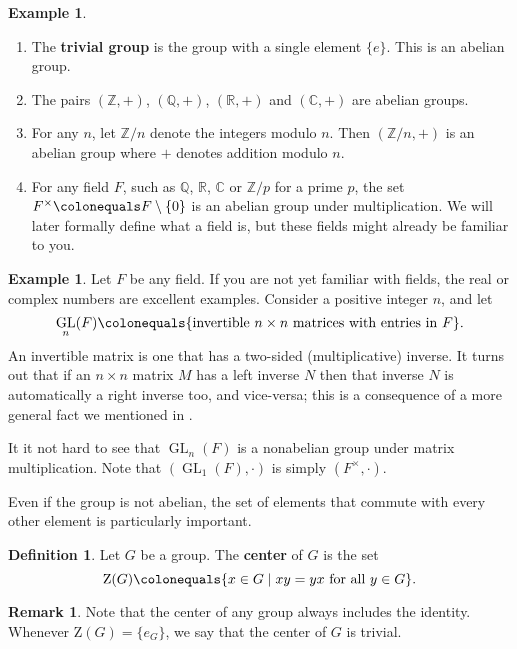 \documentclass[12pt]{report}
\numberwithin{equation}{section}
\numberwithin{theorem}{chapter}
\theoremstyle{definition}
\newtheorem{definition}[theorem]{Definition}
\newtheorem{example}[theorem]{Example}
\newtheorem*{basic properties}{Basic Properties}
\newtheorem*{Important Remark}{Important Remark}
\newtheorem{remark}[theorem]{Remark}
\newcommand{\df}[1]{{\bf #1}\index{#1}}
\DeclareMathOperator{\GL}{GL}
\newcommand{\C}{\mathbb{C}}
\begin{document}
\begin{example}$\,$
\begin{enumerate}
\item The \df{trivial group} is the group with a single element $\{e\}$. This is an abelian group. 
\item  The pairs $(\mathbb{Z}, +)$, $(\mathbb{Q}, +)$, $(\mathbb{R}, +)$ and $(\C,+)$ are abelian groups. 
\item For any $n$, let $\mathbb{Z}/n$ denote the integers modulo $n$. Then $(\mathbb{Z}/n, +)$ is an abelian group where $+$ denotes addition modulo $n$.
\item For any field $F$, such as $\mathbb{Q}$, $\mathbb{R}$, $\C$ or $\mathbb{Z}/p$ for a prime $p$, the set $F^\times \colonequals F \setminus \{0\}$ is an abelian group under multiplication. We will later formally define what a field is, but these fields might already be familiar to you.
\end{enumerate}
\end{example}

\begin{example} 
Let $F$ be any field. If you are not yet familiar with fields, the real or complex numbers are excellent examples.  Consider a positive integer $n$, and let 
$$\GL_n(F) \colonequals \{ \text{invertible }  n \times n \text{ matrices with entries in } F \}.$$
An invertible matrix is one that has a two-sided (multiplicative) inverse. It turns out that if an $n \times n$ matrix $M$ has a left inverse $N$ then that inverse $N$ is automatically a right inverse too, and vice-versa; this is a consequence of a more general fact we mentioned in .

It it not hard to see that $\GL_n(F)$ is a nonabelian group under matrix multiplication. Note that $(\GL_1(F), \cdot)$ is simply $(F^\times, \cdot)$. 	
\end{example}


Even if the group is not abelian, the set of elements that commute with every other element is particularly important.


\begin{definition}
	Let $G$ be a group. The {\bf center} of $G$ is the set
	$$\mathrm{Z}(G) \colonequals \lbrace x \in G \mid xy = yx \textrm{ for all } y \in G \rbrace.$$
\end{definition}

\begin{remark}
	Note that the center of any group always includes the identity. Whenever $\mathrm{Z}(G) = \{ e_G \}$, we say that the center of $G$ is trivial.
\end{remark}
\end{document}
